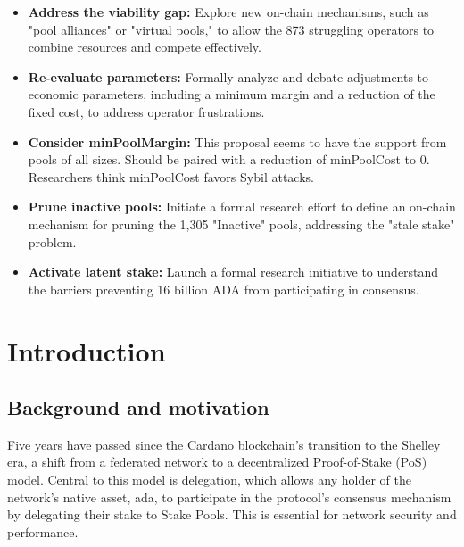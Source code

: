 \documentclass[11pt, letterpaper]{article}
\begin{document}
\begin{itemize}
    \item \textbf{Address the viability gap:} Explore new on-chain mechanisms, such as "pool alliances" or "virtual pools," to allow the 873 struggling operators to combine resources and compete effectively.
    
    \item \textbf{Re-evaluate parameters:} Formally analyze and debate adjustments to economic parameters, including a minimum margin and a reduction of the fixed cost, to address operator frustrations.

    \item \textbf{Consider minPoolMargin:} This proposal seems to have the support from pools of all sizes. Should be paired with a reduction of minPoolCost to 0. Researchers think minPoolCost favors Sybil attacks.

	\item \textbf{Prune inactive pools:} Initiate a formal research effort to define an on-chain mechanism for pruning the 1,305 "Inactive" pools, addressing the "stale stake" problem.

    \item \textbf{Activate latent stake:} Launch a formal research initiative to understand the barriers preventing 16 billion ADA from participating in consensus.
\end{itemize}

\newpage
\section{Introduction}

\subsection{Background and motivation}
Five years have passed since the Cardano blockchain's transition to the Shelley
era, a shift from a federated network to a decentralized Proof-of-Stake (PoS)
model. Central to this model is delegation, which allows any holder of the
network's native asset, ada, to participate in the protocol's consensus
mechanism by delegating their stake to Stake Pools. This is essential for
network security and performance.
\end{document}
